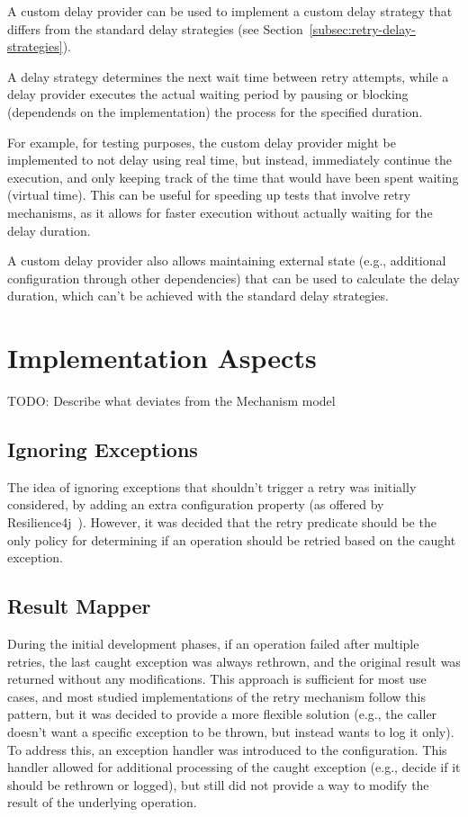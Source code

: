 A custom delay provider can be used
to implement a custom delay strategy that differs from the standard delay strategies (see Section~\ref{subsec:retry-delay-strategies}).

A delay strategy determines the next wait time between retry attempts,
while a delay provider executes the actual waiting period by pausing or blocking
(dependends on the implementation) the process for the specified duration.

For example, for testing purposes, the custom delay provider might be implemented to not delay using real time,
but instead, immediately continue the execution,
and only keeping track of the time that would have been spent waiting (virtual time).
This can be useful for speeding up tests that involve retry mechanisms, as it allows for faster execution without actually waiting for the delay duration.

A custom delay provider also allows maintaining external state
(e.g., additional configuration through other dependencies) that can be used to calculate the delay duration,
which can't be achieved with the standard delay strategies.


\section{Implementation Aspects}\label{sec:retry-implementation-aspects}

TODO: Describe what deviates from the Mechanism model

\subsection{Ignoring Exceptions}\label{subsec:retry-ignoring-exceptions}

The idea of ignoring exceptions that shouldn't trigger a retry was initially considered,
by adding an extra configuration property (as offered by Resilience4j~\cite{resilience4j-retry}).
However, it was decided
that the retry predicate should be the only policy for determining if an operation should be retried based on the caught exception.

\subsection{Result Mapper}\label{subsec:retry-result-mapper}

During the initial development phases, if an operation failed after multiple retries,
the last caught exception was always rethrown,
and the original result was returned without any modifications.
This approach is sufficient for most use cases,
and most studied implementations of the retry mechanism follow this pattern, but
it was decided to provide a more flexible solution
(e.g., the caller doesn't want a specific exception to be thrown, but instead wants to log it only).
To address this, an exception handler was introduced to the configuration.
This handler allowed for additional processing of the caught exception
(e.g., decide if it should be rethrown or logged),
but still did not provide a way to modify the result of the underlying operation.

